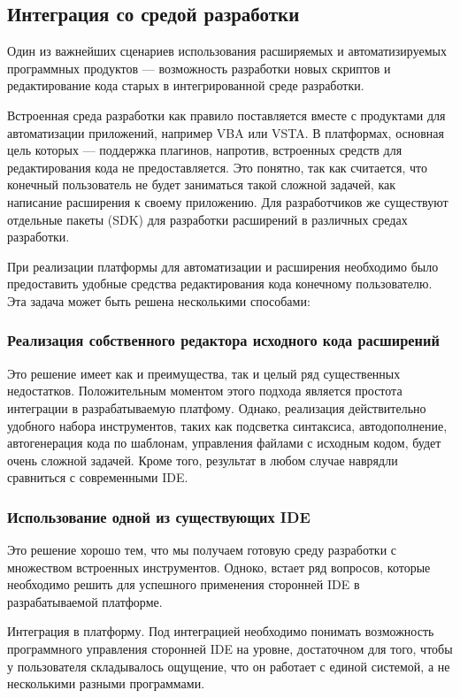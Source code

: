 \subsection{Интеграция со средой разработки}

Один из важнейших сценариев использования расширяемых и автоматизируемых программных продуктов --- возможность разработки новых скриптов и редактирование кода старых в интегрированной среде разработки.

Встроенная среда разработки как правило поставляется вместе с продуктами для автоматизации приложений, например VBA или VSTA. В платформах, основная цель которых --- поддержка плагинов, напротив, встроенных средств для редактирования кода не предоставляется. Это понятно, так как считается, что конечный пользователь не будет заниматься такой сложной задачей, как написание расширения к своему приложению. Для разработчиков же существуют отдельные пакеты (SDK) для разработки расширений в различных средах разработки.

При реализации платформы для автоматизации и расширения необходимо было предоставить удобные средства редактирования кода конечному пользователю. Эта задача может быть решена несколькими способами:

\subsubsection{Реализация собственного редактора исходного кода расширений}

Это решение имеет как и преимущества, так и целый ряд существенных недостатков. Положительным моментом этого подхода является простота интеграции в разрабатываемую платфому. Однако, реализация действительно удобного набора инструментов, таких как подсветка синтаксиса, автодополнение, автогенерация кода по шаблонам, управления файлами с исходным кодом, будет очень сложной задачей. Кроме того, результат в любом случае наврядли сравниться с современными IDE.

\subsubsection{Использование одной из существующих IDE}

Это решение хорошо тем, что мы получаем готовую среду разработки с множеством встроенных инструментов. Одноко, встает ряд вопросов, которые необходимо решить для успешного применения сторонней IDE в разрабатываемой платформе.

Интеграция в платформу. Под интеграцией необходимо понимать возможность программного управления сторонней IDE на уровне, достаточном для того, чтобы у пользователя складывалось ощущение, что он работает с единой системой, а не несколькими разными программами.

